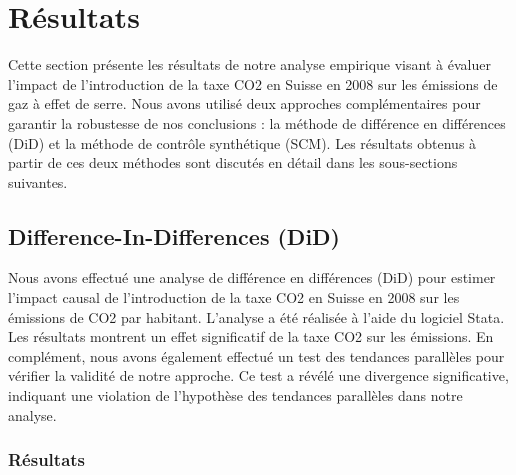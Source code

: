 \section{Résultats}
\label{sec:results}
Cette section présente les résultats de notre analyse empirique visant à évaluer l'impact de l'introduction de la taxe CO2 en Suisse en 2008 sur les émissions de gaz à effet de serre. Nous avons utilisé deux approches complémentaires pour garantir la robustesse de nos conclusions : la méthode de différence en différences (DiD) et la méthode de contrôle synthétique (SCM). Les résultats obtenus à partir de ces deux méthodes sont discutés en détail dans les sous-sections suivantes.

\subsection{Difference-In-Differences (DiD)}
\label{subsec:results_did}

Nous avons effectué une analyse de différence en différences (DiD) pour estimer l'impact causal de l'introduction de la taxe CO2 en Suisse en 2008 sur les émissions de CO2 par habitant. L'analyse a été réalisée à l'aide du logiciel Stata. Les résultats montrent un effet significatif de la taxe CO2 sur les émissions. En complément, nous avons également effectué un test des tendances parallèles pour vérifier la validité de notre approche. Ce test a révélé une divergence significative, indiquant une violation de l'hypothèse des tendances parallèles dans notre analyse.


\subsubsection{Résultats}
\label{subsubsec:results_did_table}



